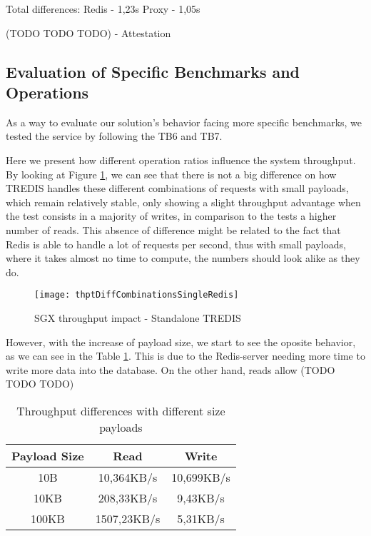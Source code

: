 Total differences: Redis - 1,23s Proxy - 1,05s

(TODO TODO TODO) - Attestation

\subsection{Evaluation of Specific Benchmarks and Operations}
\label{ssec:specificBenchmarksRedisS}

As a way to evaluate our solution's behavior facing more specific benchmarks, we tested the service by following the TB6 and TB7. 

Here we present how different operation ratios influence the system throughput. By looking at Figure \ref{fig:thptDiffCombinationsSingleRedis}, we can see that there is not a big difference on how TREDIS handles these different combinations of requests with small payloads, which remain relatively stable, only showing a slight throughput advantage when the test consists in a majority of writes, in comparison to the tests a higher number of reads. This absence of difference might be related to the fact that Redis is able to handle a lot of requests per second, thus with small payloads, where it takes almost no time to compute, the numbers should look alike as they do.  

\begin{figure}[htbp]
	\centering
	{\texttt{[image: thptDiffCombinationsSingleRedis]}}
	\caption{SGX throughput impact - Standalone TREDIS}
	\label{fig:thptDiffCombinationsSingleRedis}
\end{figure}

However, with the increase of payload size, we start to see the oposite behavior, as we can see in the Table \ref{table:throughputPayloads}. This is due to the Redis-server needing more time to write more data into the database. On the other hand, reads allow (TODO TODO TODO)

\begin{table}[ht]
	\caption{Throughput differences with different size payloads} %
	\centering %
	\begin{tabular}{c c c} %
		\hline\hline %
		\textbf{Payload Size} & \textbf{Read} & \textbf{Write} \\ [0.5ex] %
		\hline
		10B & 10,364KB/s & 10,699KB/s\\
		\hline
		10KB & 208,33KB/s & 9,43KB/s \\
		\hline %
		100KB & 1507,23KB/s & 5,31KB/s\\ [1ex] %
		\hline %
	\end{tabular}
	\label{table:throughputPayloads} %
\end{table} 

